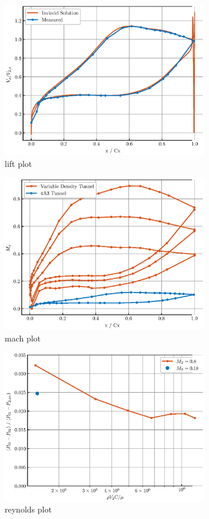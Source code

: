 \documentclass{article}
\begin{document}
\begin{figure}[H]
    \centering
    \includegraphics[width=0.8\textwidth]{figures/lift_plot.eps}
    \caption{lift plot}
    \label{fig:lift_plot}
\end{figure}
\begin{figure}[H]
    \centering
    \includegraphics[width=0.8\textwidth]{figures/mach_plot.eps}
    \caption{mach plot}
    \label{fig:mach_plot}
\end{figure}
\begin{figure}[H]
    \centering
    \includegraphics[width=0.8\textwidth]{figures/reynolds_plot.eps}
    \caption{reynolds plot}
    \label{fig:reynolds_plot}
\end{figure}
\end{document}
